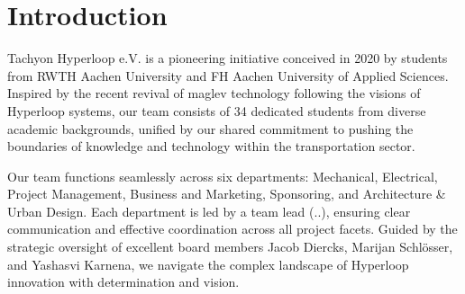 \chapter{Introduction}

Tachyon Hyperloop e.V. is a pioneering initiative conceived in 2020 by students from RWTH Aachen University and FH Aachen University of Applied Sciences. Inspired by the recent revival of maglev technology following the visions of Hyperloop systems, our team consists of 34 dedicated students from diverse academic backgrounds, unified by our shared commitment to pushing the boundaries of knowledge and technology within the transportation sector. 

Our team functions seamlessly across six  departments: Mechanical, Electrical, Project Management, Business and Marketing, Sponsoring, and Architecture \& Urban Design. Each department is led by a team lead (..), ensuring clear communication and effective coordination across all project facets. Guided by the strategic oversight of excellent board members Jacob Diercks, Marijan Schlösser, and Yashasvi Karnena, we navigate the complex landscape of Hyperloop innovation with determination and vision.
\newpage
